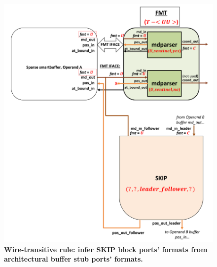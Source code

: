 \begin{figure}[ht]
\includegraphics[width=\textwidth]{figures/safinference_build_08skipportfmt.png}
\caption{\textbf{Wire-transitive rule: infer SKIP block ports' formats from architectural buffer stub ports' formats.}}
\label{fig:safinference_build_08skipportfmt}
\centering
\end{figure}



